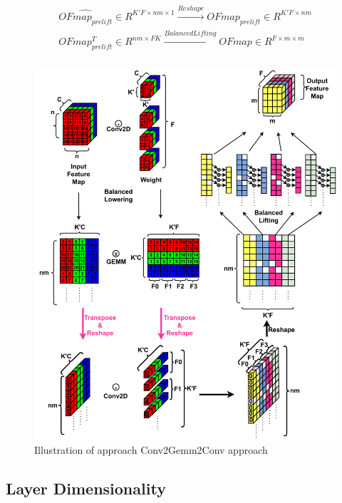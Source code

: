 \begin{equation}
    \begin{aligned}
        \hat{OFmap_{prelift}} \in R^{K'F \times nm \times 1} \xrightarrow[]{Reshape} OFmap_{prelift} \in R^{K'F\times nm} \\
        OFmap_{prelift}^T \in R^{nm\times FK} \xrightarrow[]{Balanced Lifting} OFmap \in R^{F \times m \times m} \\
            \end{aligned}
    \label{math:conv2gemm2conv:lift}
\end{equation}

\begin{figure}[]
    \centering
    \includegraphics[scale=0.5]{fig/ConvToGemmToConv.pdf}
    \caption{Illustration of approach Conv2Gemm2Conv approach}
    \label{fig:conv2gemm2conv}
\end{figure}

\subsection{Layer Dimensionality}
\label{chap:dda:dataflow_dse:GEMM_mode:layer_dimentionality}

